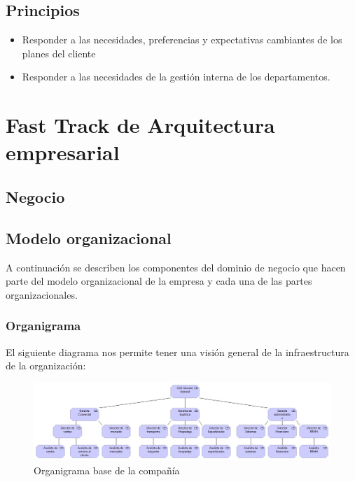\documentclass[12pt]{article}
\begin{document}


\subsection{Principios}

\begin{itemize}
    \item Responder a las necesidades, preferencias y expectativas cambiantes de los planes del  cliente
    \item Responder a las necesidades de la gestión interna de los departamentos.
\end{itemize}


\section{Fast Track de Arquitectura empresarial}

\subsection{Negocio}

\subsection{Modelo organizacional}

A continuación se describen los componentes del dominio de negocio que hacen parte del modelo organizacional de la empresa y cada una de las partes organizacionales. 



\subsubsection{Organigrama}

El siguiente diagrama nos permite tener una visión general de la infraestructura de la organización:

\begin{figure}[ht]
\centering
\centering
\includegraphics[scale=0.4]{organi.jpeg}
\caption{Organigrama base de la compañía}
\label{2}
\end{figure}
\FloatBarrier
\end{document}
